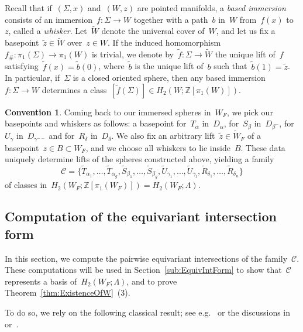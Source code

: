 \documentclass[10.9pt,a4paper]{amsart}
\theoremstyle{definition}
\newtheorem*{convention}{Convention}
\theoremstyle{remark}
\newcommand{\Z}{\mathbb{Z}}
\begin{document}
Recall that if~$(\Sigma,x)$ and~$(W,z)$ are pointed manifolds, a \emph{based immersion} consists of an
immersion~$f \colon \Sigma \to W$ together with a path~$b$ in~$W$ from~$f(x)$ to~$z$, called a \emph{whisker}. 
Let~$\widetilde{W}$ denote the universal cover of~$W$, and let us fix a basepoint~$\tilde z\in\widetilde{W}$ over~$z\in W$.
If the induced homomorphism~$f_\# \colon \pi_1(\Sigma) \to \pi_1(W)$ is trivial, we denote by~$\tilde f \colon \Sigma \to \widetilde W$ the unique lift of~$f$ satisfying~$\tilde f(x) = \tilde b(0)$, where~$\tilde b$ is the unique lift of~$b$ such that~$\tilde b(1) = \tilde z$.  
In particular, if~$\Sigma$ is a closed oriented sphere, then any based immersion~$f\colon \Sigma\to W$ determines a class~$[\tilde{f}(\Sigma)]\in H_2(W; \mathbb{Z}[\pi_1(W)])$.

\begin{convention}
Coming back to our immersed spheres in~$W_F$, we pick our basepoints and whiskers as follows:
a basepoint for~$T_{\alpha}$ in~$D_{\alpha}$, for~$S_{\beta}$ in~$D_{\beta^-}$, for~$U_{\gamma}$ in~$D_{\gamma^{--}}$ and for~$R_{\delta}$ in~$D_{\delta}$. We also fix an arbitrary lift~$\tilde{z}\in\widetilde{W}_F$ of a basepoint~$z\in B\subset W_F$, and we choose all whiskers to lie inside~$B$.
These data uniquely determine lifts of the spheres constructed above, yielding a family 
\[
\mathcal C = \{\tilde T_{\alpha_1}, \ldots, \tilde T_{\alpha_{g}}, \tilde S_{\beta_1}, \ldots, \tilde S_{\beta_{g}}, \tilde U_{\gamma_1}, \ldots,\tilde U_{\gamma_l},\tilde R_{\delta_1}, \ldots,\tilde R_{\delta_n}\}
\]
of classes in~$H_2(W_F;\Z[\pi_1(W_F)])=H_2(W_F;\Lambda)$.
\end{convention}




\subsection{Computation of the equivariant intersection form}
\label{sub:CalculInt}

In this section, we compute the pairwise equivariant intersections of the family~$\mathcal C$.
These computations will be used in Section~\ref{sub:EquivIntForm} to show that~$\mathcal C$ represents a basis of~$H_2(W_F;\Lambda)$, and to prove Theorem~\ref{thm:ExistenceOfW}~(3).
\medskip

To do so, we rely on the following classical result; see e.g.~\cite[Proposition 7.22]{RanickiAlgebraicAndGeometric} or the discussions in~\cite[Section 11.3]{DET} or~\cite[Remark 2.19]{KPRT24}.
\end{document}
